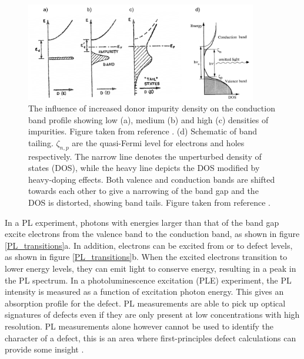 \documentclass[11pt, twoside]{report}
\begin{document}
\begin{figure}[h!]
  \centering
    \includegraphics[width=0.9\textwidth]{figures/bs2+pankove.png}
    \caption{The influence of increased donor impurity density on the conduction band profile showing low (a), medium (b) and high (c) densities of impurities. Figure taken from reference . (d) Schematic of band tailing. $\zeta_{n,p}$ are the quasi-Fermi level for electrons and holes respectively. The narrow line denotes the unperturbed density of states (DOS), while the heavy line depicts the DOS modified by heavy-doping effects. Both valence and conduction bands are shifted towards each other to give a narrowing of the band gap and the DOS is distorted, showing band tails. Figure taken from reference .}
  \label{bs2}
\end{figure}


In a PL experiment, photons with energies larger than that of the band gap excite electrons from the valence band to the conduction band, as shown in figure \ref{PL_transitions}a. In addition, electrons can be excited from or to defect levels, as shown in figure \ref{PL_transitions}b. When the excited electrons transition to lower energy levels, they can emit light to conserve energy, resulting in a peak in the PL spectrum. In a photoluminescence excitation (PLE) experiment, the PL intensity is measured as a function of excitation photon energy. This gives an absorption profile for the defect. PL measurements are able to pick up optical signatures of defects even if they are only present at low concentrations with high resolution. PL measurements alone however cannot be used to identify the character of a defect, this is an area where first-principles defect calculations can provide some insight \cite{defects_tutorial}. 
\end{document}

